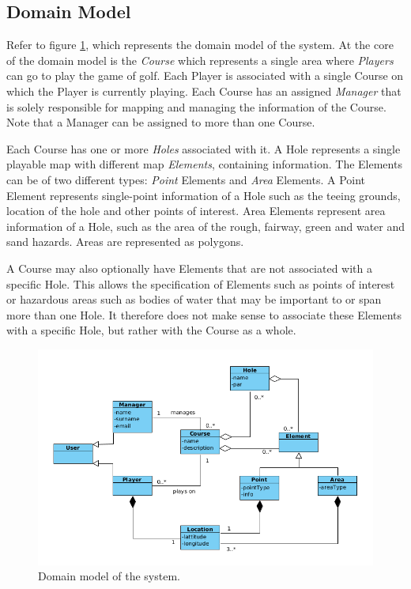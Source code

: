 \documentclass{article}
\begin{document}
    \subsection{Domain Model}

    Refer to figure \ref{fig:domainmodel}, which represents the domain model of
    the system. At the core of the domain model is the \textit{Course} which
    represents a single area where \textit{Players} can go to play the game of
    golf. Each Player is associated with a single Course on which the Player is
    currently playing. Each Course has an assigned \textit{Manager} that is
    solely responsible for mapping and managing the information of the Course.
    Note that a Manager can be assigned to more than one Course.

    Each Course has one or more \textit{Holes} associated with it. A Hole
    represents a single playable map with different map \textit{Elements},
    containing information. The Elements can be of two different types:
    \textit{Point} Elements and \textit{Area} Elements. A Point Element
    represents single-point information of a Hole such as the teeing grounds,
    location of the hole and other points of interest. Area Elements represent
    area information of a Hole, such as the area of the rough, fairway, green
    and water and sand hazards. Areas are represented as polygons.

    A Course may also optionally have Elements that are not associated with a
    specific Hole. This allows the specification of Elements such as points of
    interest or hazardous areas such as bodies of water that may be important
    to or span more than one Hole. It therefore does not make sense to
    associate these Elements with a specific Hole, but rather with the Course
    as a whole.
    
    \begin{figure}[h]
    	\centering
    	\includegraphics[scale=0.5]{DomainModel}
        \caption{Domain model of the system.}
        \label{fig:domainmodel}
    \end{figure}
\end{document}
